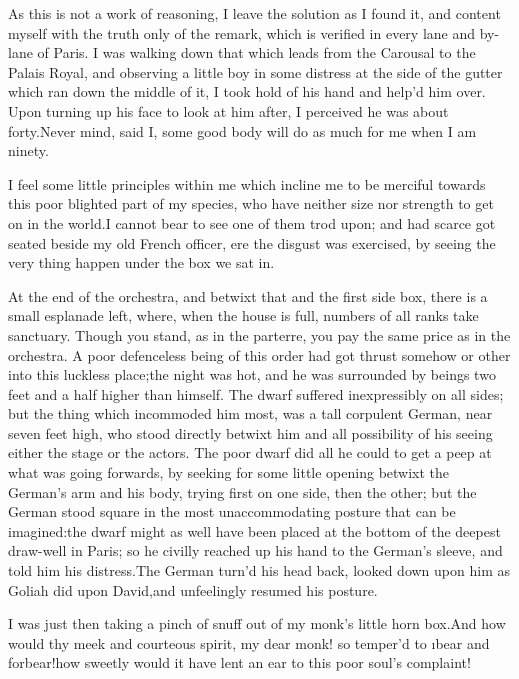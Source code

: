 \documentclass[twoside]{article}
\begin{document}
As this is not a work of reasoning, I leave the solution as I found it,
and content myself with the truth only of the remark, which is verified
in every lane and by-lane of Paris.  I was walking down that which leads
from the Carousal to the Palais Royal, and observing a little boy in some
distress at the side of the gutter which ran down the middle of it, I
took hold of his hand and help’d him over.  Upon turning up his face to
look at him after, I perceived he was about forty.\tsk Never mind, said I,
some good body will do as much for me when I am ninety.

I feel some little principles within me which incline me to be merciful
towards this poor blighted part of my species, who have neither size nor
strength to get on in the world.\tsk I cannot bear to see one of them trod
upon; and had scarce got seated beside my old French officer, ere the
disgust was exercised, by seeing the very thing happen under the box we
sat in.

At the end of the orchestra, and betwixt that and the first side box,
there is a small esplanade left, where, when the house is full, numbers
of all ranks take sanctuary.  Though you stand, as in the parterre, you
pay the same price as in the orchestra.  A poor defenceless being of this
order had got thrust somehow or other into this luckless place;\tsk the night
was hot, and he was surrounded by beings two feet and a half higher than
himself.  The dwarf suffered inexpressibly on all sides; but the thing
which incommoded him most, was a tall corpulent German, near seven feet
high, who stood directly betwixt him and all possibility of his seeing
either the stage or the actors.  The poor dwarf did all he could to get a
peep at what was going forwards, by seeking for some little opening
betwixt the German’s arm and his body, trying first on one side, then the
other; but the German stood square in the most unaccommodating posture
that can be imagined:\tsk the dwarf might as well have been placed at the
bottom of the deepest draw-well in Paris; so he civilly reached up his
hand to the German’s sleeve, and told him his distress.\tsk The German turn’d
his head back, looked down upon him as Goliah did upon David,\tsk and
unfeelingly resumed his posture.

I was just then taking a pinch of snuff out of my monk’s little horn
box.\tsk And how would thy meek and courteous spirit, my dear monk! so
temper’d to \i{bear and forbear}!\tsk how sweetly would it have lent an ear to
this poor soul’s complaint!
\end{document}
